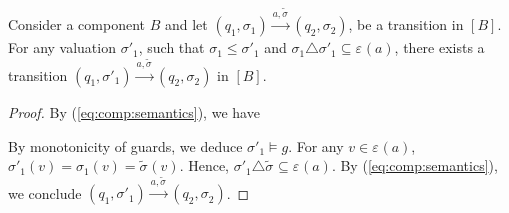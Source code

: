 \documentclass{llncs}
\newcommand{\eq}[1]{(\ref{eq:#1})}
\newcommand{\goesto}[2][]{\ensuremath{\xrightarrow[#1]{#2}}}
\newcommand{\val}[3][]{\ensuremath{#1{\sigma}^{#2}_{#3}}}
\newcommand{\primeit}[1]{#1'}
\newcommand{\export}[1][]{\ensuremath{\varepsilon_{#1}}}
\newcommand{\valdiff}[2]{\ensuremath{#1 \triangle #2}}
\newcommand{\semopen}[1]{\ensuremath{[{#1}]}}
\newcommand{\order}{\leqslant}
\begin{document}
\begin{lemma}
  \label{lem:stepabove}
  Consider a component $B$ and let 
%
  $
  (q_1, \val{}{1})
%
  \goesto{a, \val[\tilde]{}{}}
%
  (q_2, \val{}{2})
  $,
%
  be a transition in $\semopen{B}$.  For any valuation
  $\val[\primeit]{}{1}$, such that
  $\val{}{1} \order \val[\primeit]{}{1}$ and
  $\valdiff{\val{}{1}}{\val[\primeit]{}{1}} \subseteq \export(a)$,
  there exists a transition
%
  $
  (q_1, \val[\primeit]{}{1})
%
  \goesto{a, \val[\tilde]{}{}}
%
  (q_2, \val{}{2})
  $
%
  in $\semopen{B}$.
\end{lemma}
%
\begin{proof}
  By \eq{comp:semantics}, we have
%

  By monotonicity of guards, we deduce
  $\val[\primeit]{}{1} \models g$.
  For any $v \in \export(a)$,
  $\val[\primeit]{}{1}(v) = \val{}{1}(v) = \val[\tilde]{}{}(v)$.
  Hence, 
  $\valdiff{\val[\primeit]{}{1}}{\val[\tilde]{}{}}
  \subseteq \export(a)$.
  By \eq{comp:semantics}, we conclude 
%
  $
  (q_1, \val[\primeit]{}{1})
%
  \goesto{a, \val[\tilde]{}{}}
%
  (q_2, \val{}{2})
  $.  
\end{proof}
\end{document}
